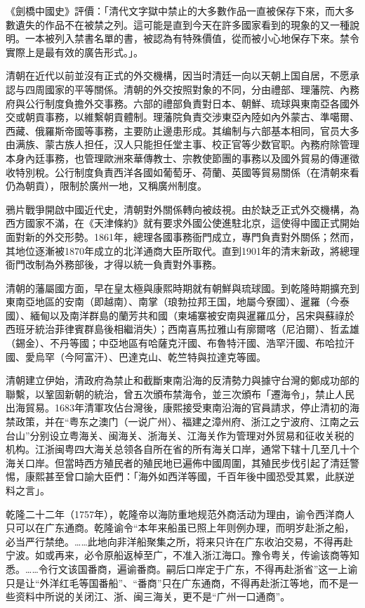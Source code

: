 《劍橋中國史》評價：「清代文字獄中禁止的大多數作品一直被保存下來，而大多數遺失的作品不在被禁之列。這可能是直到今天在許多國家看到的現象的又一種說明。一本被列入禁書名單的書，被認為有特殊價值，從而被小心地保存下來。禁令實際上是最有效的廣告形式。」。

清朝在近代以前並沒有正式的外交機構，因当时清廷一向以天朝上国自居，不愿承認与四周國家的平等關係。清朝的外交按照對象的不同，分由禮部、理藩院、內務府與公行制度負擔外交事務。六部的禮部負責對日本、朝鮮、琉球與東南亞各國外交或朝貢事務，以維繫朝貢體制。理藩院負責交涉東亞內陸如內外蒙古、準噶爾、西藏、俄羅斯帝國等事務，主要防止邊患形成。其编制与六部基本相同，官员大多由满族、蒙古族人担任，汉人只能担任堂主事、校正官等少数官职。內務府除管理本身內廷事務，也管理歐洲來華傳教士、宗教使節團的事務以及國外貿易的傳運徵收特別稅。公行制度負責西洋各國如葡萄牙、荷蘭、英國等貿易關係（在清朝來看仍為朝貢），限制於廣州一地，又稱廣州制度。

鴉片戰爭開啟中國近代史，清朝對外關係轉向被歧視。由於缺乏正式外交機構，為西方國家不滿，在《天津條約》就有要求外國公使進駐北京，這使得中國正式開始面對新的外交形勢。1861年，總理各國事務衙門成立，專門負責對外關係；然而，其地位逐漸被1870年成立的北洋通商大臣所取代。直到1901年的清末新政，將總理衙門改制為外務部後，才得以統一負責對外事務。

清朝的藩屬國方面，早在皇太極與康熙時期就有朝鮮與琉球國。到乾隆時期擴充到東南亞地區的安南（即越南）、南掌（琅勃拉邦王国，地屬今寮國）、暹羅（今泰國）、緬甸以及南洋群島的蘭芳共和國（柬埔寨被安南與暹羅瓜分，呂宋與蘇祿於西班牙統治菲律賓群島後相繼消失）；西南喜馬拉雅山有廓爾喀（尼泊爾）、哲孟雄（錫金）、不丹等國；中亞地區有哈薩克汗國、布魯特汗國、浩罕汗國、布哈拉汗國、愛烏罕（今阿富汗）、巴達克山、乾竺特與拉達克等國。

清朝建立伊始，清政府為禁止和截斷東南沿海的反清勢力與據守台灣的鄭成功部的聯繫，以鞏固新朝的統治，曾五次頒布禁海令，並三次頒布「遷海令」，禁止人民出海貿易。1683年清軍攻佔台灣後，康熙接受東南沿海的官員請求，停止清初的海禁政策，并在“粤东之澳门（一说广州）、福建之漳州府、浙江之宁波府、江南之云台山”分别设立粤海关、闽海关、浙海关、江海关作为管理对外贸易和征收关税的机构。江浙闽粤四大海关总领各自所在省的所有海关口岸，通常下辖十几至几十个海关口岸。但當時西方殖民者的殖民地已遍佈中國周圍，其殖民步伐引起了清廷警惕，康熙甚至曾口諭大臣們：「海外如西洋等國，千百年後中國恐受其累，此朕逆料之言」。

乾隆二十二年（1757年），乾隆帝以海防重地规范外商活动为理由，谕令西洋商人只可以在广东通商。乾隆谕令“本年来船虽已照上年则例办理，而明岁赴浙之船，必当严行禁绝。……此地向非洋船聚集之所，将来只许在广东收泊交易，不得再赴宁波。如或再来，必令原船返棹至广，不准入浙江海口。豫令粤关，传谕该商等知悉。……令行文该国番商，遍谕番商。嗣后口岸定于广东，不得再赴浙省”这一上谕只是让“外洋红毛等国番船”、“番商”只在广东通商，不得再赴浙江等地，而不是一些资料中所说的关闭江、浙、闽三海关，更不是“广州一口通商”。

